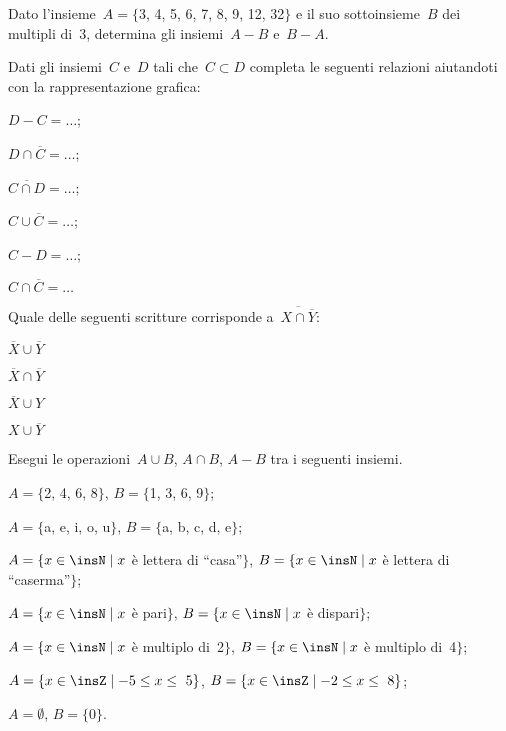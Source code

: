 \begin{esercizio}
\label{ese:5.103}
Dato l'insieme~$A=\{$3, 4, 5, 6, 7, 8, 9, 12, 32$\}$ e il suo sottoinsieme~$B$ dei multipli di~3, determina gli
insiemi~$A-B$ e~$B-A$.
\end{esercizio}

\begin{esercizio}
\label{ese:5.104}
Dati gli insiemi~$C$ e~$D$ tali che~$C\subset D$
completa le seguenti relazioni aiutandoti con la rappresentazione
grafica:
\begin{multicols}{3}
\begin{enumeratea}
\item $D-C=\ldots$;
\item $D\cap \overline{C}=\ldots$;
\item $\overline{C\cap D}=\ldots$;
\item $C\cup \overline{C}=\ldots$;
\item $C-D=\ldots$;
\item $C\cap \overline{C}=\ldots$
\end{enumeratea}
\end{multicols}
\end{esercizio}

\begin{esercizio}[\Ast]
\label{ese:5.105}
Quale delle seguenti scritture corrisponde a~$\overline{{X\cap \overline{Y}}}$:
\begin{multicols}{4}
 \begin{enumeratea}
 \item $\overline{X}\cup \overline{Y}$
 \item $\overline{X}\cap \overline{Y}$
 \item $\overline{X}\cup Y$
 \item $X\cup \overline{Y}$
 \end{enumeratea}
\end{multicols}
\end{esercizio}

\begin{esercizio}
\label{ese:5.106}
Esegui le operazioni~$A\cup B$, $A\cap B$, $A-B$ tra i seguenti insiemi.

\begin{enumeratea}
\item $A=\{$2, 4, 6, 8$\}$, $B=\{$1, 3, 6, 9$\}$;
\item $A=\{$a, e, i, o, u$\}$, $B=\{$a, b, c, d, e$\}$;
\item $A=\{x\in\insN\mid x$ è lettera di ``casa''$\}$, $B=\{x\in\insN\mid x$ è lettera di ``caserma''$\}$;
\item $A=\{x\in\insN\mid x$ è pari$\}$, $B=\{x\in\insN\mid x$ è dispari$\}$;
\item $A=\{x\in\insN\mid x$ è multiplo di~2$\}$, $B=\{x\in\insN\mid x$ è multiplo di~4$\}$;
\item $A=\{x\in\insZ\mid -5\le x\le~5\}$, $B=\{x\in\insZ\mid -2\le x\le~8\}$;
\item $A=\emptyset$, $B=\{0\}$.
\end{enumeratea}
\end{esercizio}

